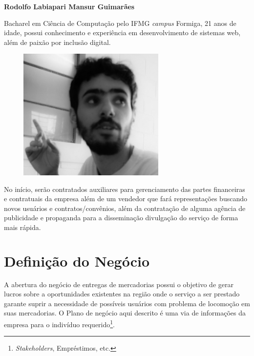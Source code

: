 		\begin{minipage}{0.6\textwidth}
			
			\textbf{Rodolfo Labiapari Mansur Guimarães}
			
			Bacharel em Ciência de Computação pelo IFMG \textit{campus} Formiga, 21 anos de idade, possui conhecimento e experiência em desenvolvimento de sistemas web, além de paixão por inclusão digital.
				
			
		\end{minipage}
		\begin{minipage}{0.4\textwidth}
			
			\begin{figure}[H]
				\centering
				\includegraphics[width=0.65\textwidth]{img/dolfpb.jpg}
			\end{figure}
			
		\end{minipage}
				
		
		No início, serão contratados auxiliares para gerenciamento das partes financeiras e contratuais da empresa além de um vendedor que fará representações buscando novos usuários e contratos/convênios, além da contratação de alguma agência de publicidade e propaganda para a disseminação divulgação do serviço de forma mais rápida.
	
	\section{Definição do Negócio}
		A abertura do negócio de entregas de mercadorias possui o objetivo de gerar lucros sobre a oportunidades existentes na região onde o serviço a ser prestado garante suprir a necessidade de possíveis usuários com problema de locomoção em suas mercadorias. O Plano de negócio aqui descrito é uma via de informações da empresa para o indivíduo requerido\footnote{\textit{Stakeholders}, Empréstimos, etc.}.
		
